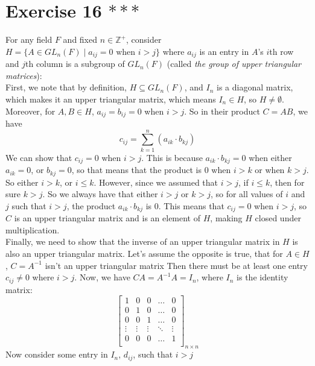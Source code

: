 \documentclass[12pt]{article}
\newcommand{\Z}{\mathbb{Z}}
\begin{document}
    \section*{Exercise 16 $***$}
    For any field $F$ and fixed $n \in \Z^+$,
    consider $H = \{ A \in GL_n(F) \mid a_{ij} = 0 \text{ when } i > j\}$
    where $a_{ij}$ is an entry in $A$'s $i$th row and $j$th column
    is a subgroup of $GL_n(F)$
    (called \textit{ the group of upper triangular matrices}): \\
    First, we note that by definition, $H \subseteq GL_n(F)$,
    and $I_n$ is a diagonal matrix,
    which makes it an upper triangular matrix,
    which means $I_n \in H$,
    so $H \neq \emptyset$. \\ 
    Moreover, for $A, B \in H$, $a_{ij} = b_{ij} = 0$ when $i > j$.
    So in their product $C = AB$, we have 
    \[ c_{ij} = \sum_{k = 1}^n (a_{ik} \cdot b_{kj}) \]
    We can show that $c_{ij} = 0$ when $i > j$.
    This is because $a_{ik} \cdot b_{kj} = 0$
    when either $a_{ik} = 0$, or $b_{kj} = 0$,
    so that means that the product is 0 when $i > k$
    or when $k > j$.
    So either $i > k$, or $i \leqslant k$.
    However, since we assumed that $i > j$,
    if $i \leqslant k$, then for sure $k > j$.
    So we always have that either $i > j$ or $k > j$,
    so for all values of $i$ and $j$ such that $i > j$,
    the product $a_{ik} \cdot b_{kj}$ is 0.
    This means that $c_{ij} = 0$ when $i > j$,
    so $C$ is an upper triangular matrix and is an element of $H$,
    making $H$ closed under multiplication. \\ 
    Finally, we need to show that the inverse of an upper triangular
    matrix in $H$ is also an upper triangular matrix.
    Let's assume the opposite is true, that for $A \in H$,
    $C = A^{-1}$ isn't an upper triangular matrix
    Then there must be at least one entry $c_{ij} \neq 0$
    where $i > j$.
    Now, we have $CA = A^{-1}A = I_n$,
    where $I_n$ is the identity matrix:
    \[ \begin{bmatrix}
        1 & 0 & 0 & \dots & 0 \\
        0 & 1 & 0 & \dots & 0 \\
        0 & 0 & 1 & \dots & 0 \\
        \vdots & \vdots & \vdots & \ddots & \vdots \\
        0 & 0 & 0 & \dots & 1 \\
    \end{bmatrix}_{n \times n} \]
    Now consider some entry in $I_n$, $d_{ij}$, such that $i > j$
\end{document}
